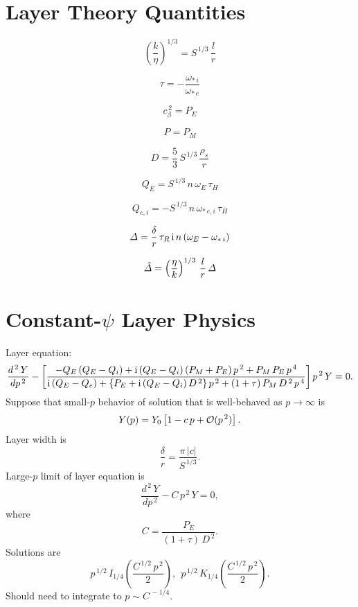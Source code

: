 \documentclass[12pt]{article}
\begin{document}
\section{Layer Theory Quantities}
\begin{description}
\item 
$$
\left(\frac{k}{\eta}\right)^{1/3} = S^{\,1/3}\,\frac{l}{r}
$$
\item
$$
\tau = -\frac{\omega_{\ast\,i}}{\omega_{\ast\,e}}
$$
\item
$$
 c_\beta^{\,2} = P_E
 $$
 \item
 $$
 P=P_M
 $$
\item 
$$
D= \frac{5}{3}\,S^{\,1/3}\,\frac{\rho_s}{r}
$$ 
\item 
$$
Q_E= S^{\,1/3}\,n\,\omega_E\,\tau_H
$$
\item 
$$
Q_{e,i}= -S^{\,1/3}\,n\,\omega_{\ast\,e,i}\,\tau_H
$$
\item 
$$
{\mit\Delta} = \frac{\delta}{r}\,\tau_R\,{\rm i}\,n\,(\omega_E-\omega_{\ast\,i})
$$
\item 
$$
\hat{\mit\Delta} = \left(\frac{\eta}{k}\right)^{1/3} \,\frac{l}{r}\,{\mit\Delta}
$$

\section{Constant-$\psi$ Layer Physics}
Layer equation:
$$
\frac{d^{\,2}\,Y}{dp^{\,2}} -\left[\frac{-Q_E\,(Q_E-Q_i)+{\rm i}\,(Q_E-Q_i)\,(P_M+P_E)\,p^{\,2}+
P_M\,P_E\,p^{\,4}}
{{\rm i}\,(Q_E-Q_e) +\{P_E + {\rm i}\,(Q_E-Q_i)\,D^{\,2}\}\,p^{\,2}+(1+\tau)\,P_M\,D^{\,2}\,p^{\,4}}
\right] p^{\,2}\, Y = 0.
$$
Suppose that small-$p$ behavior of solution that is well-behaved as $p\rightarrow \infty$ is
$$
Y(p) = Y_0\left[1 - c\,p+{\cal O}(p^{\,2})\right].
$$
Layer width is 
$$
\frac{\delta}{r} = \frac{\pi\,|c|}{S^{\,1/3}}.
$$
Large-$p$ limit of layer equation
is
$$
\frac{d^{\,2}\,Y}{dp^{\,2}} - C\, p^{\,2}\, Y = 0,
$$
where
$$
C = \frac{P_E}{(1+\tau)\,D^{\,2}}.
$$
Solutions are
$$
p^{\,1/2}\,I_{1/4}\left(\frac{C^{\,1/2}\,p^{\,2}}{2}\right),~~ p^{\,1/2}\,K_{1/4}\left(\frac{C^{\,1/2}\,p^{\,2}}{2}\right).
$$
Should need to integrate to $p\sim C^{\,-1/4}$. 



\end{description}
\end{document}
